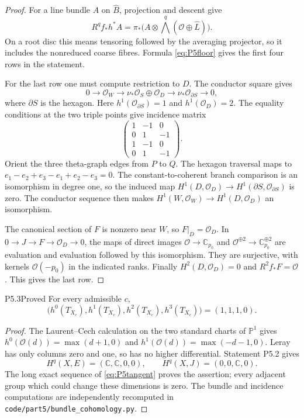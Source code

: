 \begin{proof}
For a line bundle $A$ on $\widehat B$, projection and descent give
\[
 R^qf_*h^*A=\pi_*\bigl(A\otimes
              \bigwedge^q(\mathcal O\oplus\widehat L)\bigr).
\]
On a root disc this means tensoring followed by the averaging
projector, so it includes the nonreduced coarse fibres.  Formula
\eqref{eq:P5floor} gives the first four rows in the statement.

For the last row one must compute restriction to $D$.  The conductor
square gives
\[
0\to\mathcal O_W\to\nu_*\mathcal O_S\oplus\mathcal O_D
\to\nu_*\mathcal O_{\partial S}\to0,
\]
where $\partial S$ is the hexagon.  Here $h^1(\mathcal O_{\partial S})=1$
and $h^1(\mathcal O_D)=2$.  The equality conditions at the two triple
points give incidence matrix
\[
 \begin{pmatrix}1&-1&0\\0&1&-1\\1&-1&0\\0&1&-1\end{pmatrix}.
\]
Orient the three theta-graph edges from $P$ to $Q$.  The hexagon
traversal maps to $e_1-e_2+e_3-e_1+e_2-e_3=0$.  The constant-to-coherent
branch comparison is an isomorphism in degree one, so the induced map
$H^1(D,\mathcal O_D)\to H^1(\partial S,\mathcal O_{\partial S})$ is
zero.  The conductor sequence then makes
$H^1(W,\mathcal O_W)\to H^1(D,\mathcal O_D)$ an isomorphism.

The canonical section of $F$ is nonzero near $W$, so $F|_D=\mathcal O_D$.
In $0\to J\to F\to\mathcal O_D\to0$, the maps of direct images
$\mathcal O\to\mathbb C_{p_0}$ and
$\mathcal O^{\oplus2}\to\mathbb C_{p_0}^{\oplus2}$ are evaluation and
evaluation followed by this isomorphism.  They are surjective, with
kernels $\mathcal O(-p_0)$ in the indicated ranks.  Finally
$H^2(D,\mathcal O_D)=0$ and $R^2f_*F=\mathcal O$.  This gives the last row.
\end{proof}

\begin{statement}{P5.3}{Proved}
For every admissible $c$,
\[
 \bigl(h^0(T_{X_c}),h^1(T_{X_c}),h^2(T_{X_c}),h^3(T_{X_c})\bigr)
 =(1,1,1,0).
\]
\end{statement}
\begin{proof}
The Laurent--Cech calculation on the two standard charts of
$\mathbb P^1$ gives $h^0(\mathcal O(d))=\max(d+1,0)$ and
$h^1(\mathcal O(d))=\max(-d-1,0)$.  Leray has only columns zero and one,
so has no higher differential.  Statement P5.2 gives
\[
 H^q(X,E)=(\mathbb C,\mathbb C,0,0),\qquad
 H^q(X,J)=(0,0,\mathbb C,0).
\]
The long exact sequence of \eqref{eq:P5tangent} proves the assertion;
every adjacent group which could change these dimensions is zero.
The bundle and incidence computations are independently recomputed in
\texttt{code/part5/bundle\_cohomology.py}.
\end{proof}

